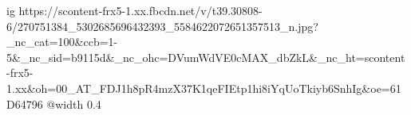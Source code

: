  
 
 
 
 

\ifcmt
  ig https://scontent-frx5-1.xx.fbcdn.net/v/t39.30808-6/270751384_5302685696432393_5584622072651357513_n.jpg?_nc_cat=100&ccb=1-5&_nc_sid=b9115d&_nc_ohc=DVumWdVE0cMAX_dbZkL&_nc_ht=scontent-frx5-1.xx&oh=00_AT_FDJ1h8pR4mzX37K1qeFIEtp1hi8iYqUoTkiyb6SnhIg&oe=61D64796
  @width 0.4
\fi
